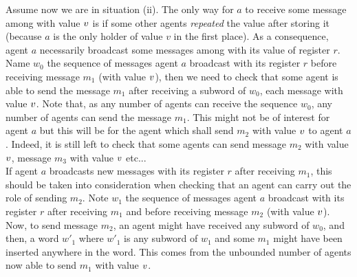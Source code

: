 Assume now we are in situation (ii). The only way for $a$ to receive some message among with value $v$ is if some other agents \emph{repeated} the value after storing it (because $a$ is the only holder of value $v$ in the first place). As a consequence, agent $a$ necessarily broadcast some messages among with its value of register $r$. Name $w_0$ the sequence of messages agent $a$ broadcast with its register $r$ before receiving message $m_1$ (with value $v$), then we need to check that some agent is able to send the message $m_1$ after receiving a subword of $w_0$, each message with value $v$. Note that, as any number of agents can receive the sequence $w_0$, any number of agents can send the message $m_1$. This might not be of interest for agent $a$ but this will be for the agent which shall send $m_2$ with value $v$ to agent $a$. Indeed, it is still left to check that some agents can send message $m_2$ with value $v$, message $m_3$ with value $v$ etc...\\
If agent $a$ broadcasts new messages with its register $r$ after receiving $m_1$, this should be taken into consideration when checking that an agent can carry out the role of sending $m_2$. Note $w_1$ the sequence of messages agent $a$ broadcast with its register $r$ after receiving $m_1$ and before receiving message $m_2$ (with value $v$). Now, to send message $m_2$, an agent might have received any subword of $w_0$, and then, a word $w'_1$ where $w'_1$ is any subword of $w_1$ and some $m_1$ might have been inserted anywhere in the word. This comes from the unbounded number of agents now able to send $m_1$ with value $v$.


